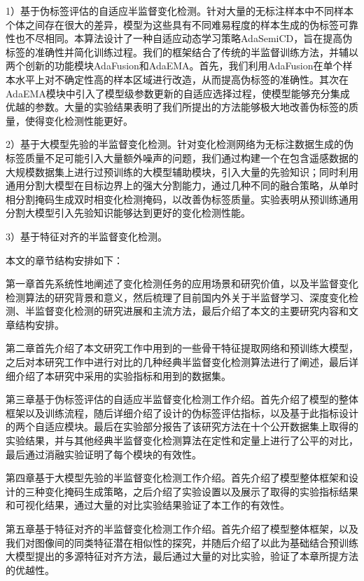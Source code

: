 \documentclass[lang=chs, degree=master, blindreview=false, adobe=false]{yanputhesis}
\begin{document}
1）基于伪标签评估的自适应半监督变化检测。针对大量的无标注样本中不同样本个体之间存在很大的差异，模型为这些具有不同难易程度的样本生成的伪标签可靠性也不尽相同。本算法设计了一种自适应动态学习策略AdaSemiCD，旨在提高伪标签的准确性并简化训练过程。我们的框架结合了传统的半监督训练方法，并辅以两个创新的功能模块AdaFusion和AdaEMA。首先，我们利用AdaFusion在单个样本水平上对不确定性高的样本区域进行改造，从而提高伪标签的准确性。其次在AdaEMA模块中引入了模型级参数更新的自适应选择过程，使模型能够充分集成优越的参数。大量的实验结果表明了我们所提出的方法能够极大地改善伪标签的质量，使得变化检测性能更好。

2）基于大模型先验的半监督变化检测。针对变化检测网络为无标注数据生成的伪标签质量不足可能引入大量额外噪声的问题，我们通过构建一个在包含遥感数据的大规模数据集上进行过预训练的大模型辅助模块，引入大量的先验知识；同时利用通用分割大模型在目标边界上的强大分割能力，通过几种不同的融合策略，从单时相分割掩码生成双时相变化检测掩码，以改善伪标签质量。实验表明从预训练通用分割大模型引入先验知识能够达到更好的变化检测性能。

3）基于特征对齐的半监督变化检测。

本文的章节结构安排如下：

第一章首先系统性地阐述了变化检测任务的应用场景和研究价值，以及半监督变化检测算法的研究背景和意义，然后梳理了目前国内外关于半监督学习、深度变化检测、半监督变化检测的研究进展和主流方法，最后介绍了本文的主要研究内容和文章结构安排。

第二章首先介绍了本文研究工作中用到的一些骨干特征提取网络和预训练大模型，之后对本研究工作中进行对比的几种经典半监督变化检测算法进行了阐述，最后详细介绍了本研究中采用的实验指标和用到的数据集。

第三章基于伪标签评估的自适应半监督变化检测工作介绍。首先介绍了模型的整体框架以及训练流程，随后详细介绍了设计的伪标签评估指标，以及基于此指标设计的两个自适应模块。最后在实验部分报告了该研究方法在十个公开数据集上取得的实验结果，并与其他经典半监督变化检测算法在定性和定量上进行了公平的对比，最后通过消融实验证明了每个模块的有效性。

第四章基于大模型先验的半监督变化检测工作介绍。首先介绍了模型整体框架和设计的三种变化掩码生成策略，之后介绍了实验设置以及展示了取得的实验指标结果和可视化结果，通过大量的对比实验结果验证了本工作的有效性。

第五章基于特征对齐的半监督变化检测工作介绍。首先介绍了模型整体框架，以及我们对图像间的同类特征潜在相似性的探究，并随后介绍了以此为基础结合预训练大模型提出的多源特征对齐方法，最后通过大量的对比实验，验证了本章所提方法的优越性。
\end{document}

